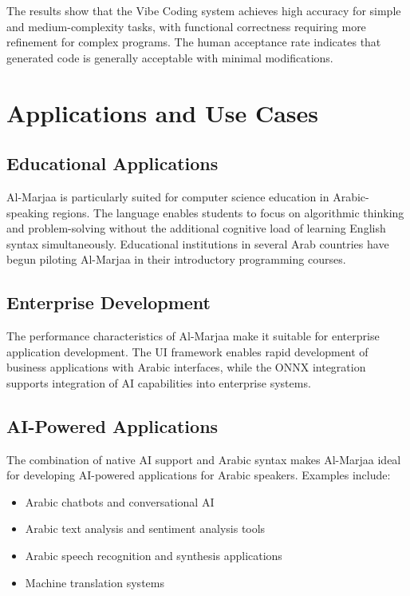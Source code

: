 \documentclass[11pt,a4paper]{article}
\begin{document}
The results show that the Vibe Coding system achieves high accuracy for simple and medium-complexity tasks, with functional correctness requiring more refinement for complex programs. The human acceptance rate indicates that generated code is generally acceptable with minimal modifications.

\section{Applications and Use Cases}

\subsection{Educational Applications}

Al-Marjaa is particularly suited for computer science education in Arabic-speaking regions. The language enables students to focus on algorithmic thinking and problem-solving without the additional cognitive load of learning English syntax simultaneously. Educational institutions in several Arab countries have begun piloting Al-Marjaa in their introductory programming courses.

\subsection{Enterprise Development}

The performance characteristics of Al-Marjaa make it suitable for enterprise application development. The UI framework enables rapid development of business applications with Arabic interfaces, while the ONNX integration supports integration of AI capabilities into enterprise systems.

\subsection{AI-Powered Applications}

The combination of native AI support and Arabic syntax makes Al-Marjaa ideal for developing AI-powered applications for Arabic speakers. Examples include:
\begin{itemize}
    \item Arabic chatbots and conversational AI
    \item Arabic text analysis and sentiment analysis tools
    \item Arabic speech recognition and synthesis applications
    \item Machine translation systems
\end{itemize}
\end{document}
